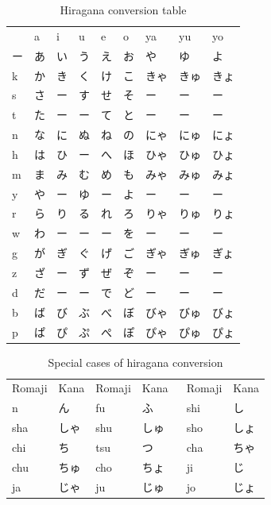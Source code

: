 \documentclass[thesis=B,english,hidelinks]{FITthesisXE}[2012/06/26]
\begin{document}
\begin{table}[htb]
\centering
\caption{Hiragana conversion table}
\label{hiragana-table}
\begin{tabular}{lllllllll}
 & a & i & u & e & o & ya & yu & yo\\
ー & あ & い & う & え & お & や & ゆ & よ\\
k & か & き & く & け & こ & きゃ & きゅ & きょ\\
s & さ & ー & す & せ & そ & ー & ー & ー\\
t & た & ー & ー & て & と & ー & ー & ー\\
n & な & に & ぬ & ね & の & にゃ & にゅ & にょ\\
h & は & ひ & ー & へ & ほ & ひゃ & ひゅ & ひょ\\
m & ま & み & む & め & も & みゃ & みゅ & みょ\\
y & や & ー & ゆ & ー & よ & ー & ー & ー\\
r & ら & り & る & れ & ろ & りゃ & りゅ & りょ\\
w & わ & ー & ー & ー & を & ー & ー & ー\\
g & が & ぎ & ぐ & げ & ご & ぎゃ & ぎゅ & ぎょ\\
z & ざ & ー & ず & ぜ & ぞ & ー & ー & ー\\
d & だ & ー & ー & で & ど & ー & ー & ー\\
b & ば & び & ぶ & べ & ぼ & びゃ & びゅ & びょ\\
p & ぱ & ぴ & ぷ & ぺ & ぽ & ぴゃ & ぴゅ & ぴょ
\end{tabular}
\end{table}

\begin{table}[htb]
\centering
\caption{Special cases of hiragana conversion}
\label{hiragana-table-special}
\begin{tabular}{llllll}
Romaji & Kana & Romaji & Kana & Romaji & Kana\\
n & ん & fu & ふ & shi & し\\
sha & しゃ & shu & しゅ & sho & しょ\\
chi & ち & tsu & つ　& cha & ちゃ\\
chu & ちゅ & cho & ちょ　& ji & じ\\
ja & じゃ & ju & じゅ　& jo & じょ
\end{tabular}
\end{table}

\newpage
\end{document}
